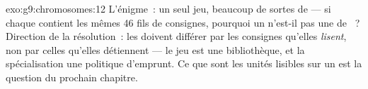 \begin{solution}{exo:g9:chromosomes:12}
L'énigme~: un seul jeu, beaucoup de sortes de  ---
si chaque  contient les mêmes 46 fils de consignes,
pourquoi un  n'est-il pas une  de ~?
Direction de la résolution~: les  doivent différer
par les consignes qu'elles \emph{lisent}, non par celles
qu'elles détiennent --- le jeu est une bibliothèque, et la
spécialisation une politique d'emprunt. Ce que sont les
unités lisibles sur un  est la question du
prochain chapitre.
\end{solution}

